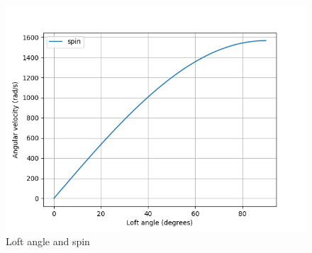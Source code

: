 \documentclass[12pt]{article}
\begin{document}
\begin{figure}[H]
\centering
\caption{Loft angle and spin}
\includegraphics[scale=0.6]{loftangleandspin}
\end{figure}
\end{document}
